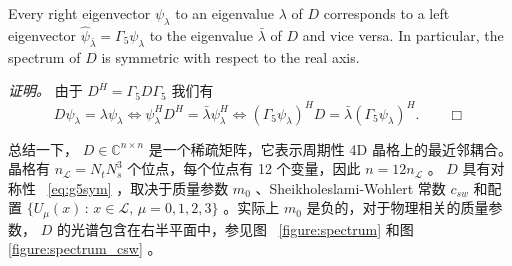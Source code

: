 \documentclass{siamltex}
\begin{document}
\begin{lemma} \label{lem:g5sym} Every right eigenvector         $\psi_\lambda$         to an eigenvalue         $\lambda$         of         $D$         corresponds to a left eigenvector         $\hat\psi_{\bar\lambda} = \Gamma_5 \psi_{\lambda}$
  to the eigenvalue         $\bar\lambda$         of         $D$         and vice versa. In particular, the spectrum of         $D$         is symmetric with respect to the real axis.
\end{lemma}

{    \em    证明。   }  由于    $D^H = \Gamma_5 D \Gamma_5$    我们有
\[
  D\psi_\lambda = \lambda\psi_\lambda \Leftrightarrow \psi_\lambda^H D^H = \bar{\lambda} \psi_\lambda^H \Leftrightarrow  (\Gamma_5 \psi_\lambda)^H D = \bar{\lambda} (\Gamma_5 \psi_\lambda)^H. \quad \quad \Box
\]

总结一下，   $D \in \mathbb{C}^{n\times n}$    是一个稀疏矩阵，它表示周期性 4D 晶格上的最近邻耦合。晶格有    $n_{\mathcal{L}} = N_tN_s^3$    个位点，每个位点有 12 个变量，因此    $n = 12n_{\mathcal{L}}$    。   $D$    具有对称性~    \eqref{eq:g5sym}    ，取决于质量参数    $m_0$    、Sheikholes\-la\-mi-Wohlert 常数    $c_{sw}$    和配置    $ \{  U_\mu(x) \, : \, x \in \mathcal{L} , \, \mu=0,1,2,3  \} $    。实际上    $m_0$    是负的，对于物理相关的质量参数，   $D$    的光谱包含在右半平面中，参见图~    \ref{figure:spectrum}    和图~    \ref{figure:spectrum_csw}    。
\end{document}
